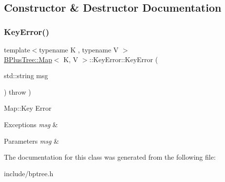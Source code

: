 \subsection{Constructor \& Destructor Documentation}
\mbox{\label{class_b_plus_tree_1_1_map_1_1_key_error_a9cc95d98613dc60ed60d6da28d912918}} 
\subsubsection{\texorpdfstring{Key\+Error()}{KeyError()}}
{\footnotesize\ttfamily template$<$typename K , typename V $>$ \\
\hyperlink{class_b_plus_tree_1_1_map}{B\+Plus\+Tree\+::\+Map}$<$ K, V $>$\+::Key\+Error\+::\+Key\+Error (\begin{DoxyParamCaption}\item[{std\+::string}]{msg }\end{DoxyParamCaption}) throw  ) \hspace{0.3cm}{\ttfamily [inline]}}

Map\+::\+Key Error


\begin{DoxyExceptions}{Exceptions}
{\em msg} & \\
\hline
\end{DoxyExceptions}

\begin{DoxyParams}{Parameters}
{\em msg} & \\
\hline
\end{DoxyParams}


The documentation for this class was generated from the following file\+:\begin{DoxyCompactItemize}
\item 
include/bptree.\+h\end{DoxyCompactItemize}
